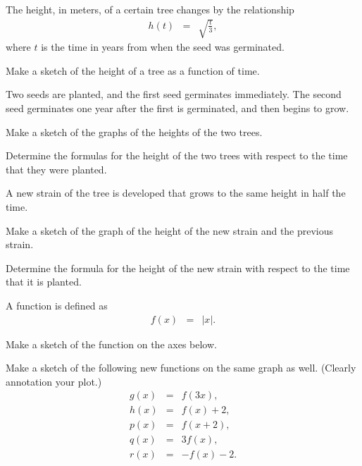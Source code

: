 \begin{problem}
\item The height, in meters, of a certain tree changes by the
  relationship
  \begin{eqnarray*}
    h(t) & = & \sqrt{\frac{t}{3}},
  \end{eqnarray*}
  where $t$ is the time in years from when the seed was germinated.
  \begin{subproblem}
  \item Make a sketch of the height of a tree as a function of time.
    \vfill
  \item Two seeds are planted, and the first seed germinates
    immediately. The second seed germinates one year after the first
    is germinated, and then begins to grow.
    \begin{subsubproblem}
    \item Make a sketch of the graphs of the heights of the two trees.
      \vfill
    \item Determine the formulas for the height of the two trees with
      respect to the time that they were planted.
      \vfill
    \end{subsubproblem}

    \clearpage
  \item A new strain of the tree is developed that grows to the same height
    in half the time. 
    \begin{subsubproblem}
    \item Make a sketch of the graph of the height of the new strain and
      the previous strain.
      \vfill
    \item Determine the formula for the height of the new strain with
      respect to the time that it is planted.
      \vfill
    \end{subsubproblem}
  \end{subproblem}

  \clearpage

\item A function is defined as
  \begin{eqnarray*}
    f(x) & = & |x|.
  \end{eqnarray*}
  \begin{subproblem}
  \item Make a sketch of the function on the axes below.
  \item Make a sketch of the following new functions on the same graph
    as well. (Clearly annotation your plot.)
    \begin{eqnarray*}
      g(x) & = & f(3x), \\
      h(x) & = & f(x)+2, \\
      p(x) & = & f(x+2), \\
      q(x) & = & 3f(x), \\
      r(x) & = & -f(x)-2.
    \end{eqnarray*}


\end{subproblem}
\end{problem}
